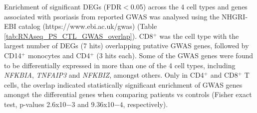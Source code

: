 \begin{figure}[htbp]
\label{figure:RNAseq_PS_CTL_volcano_plots}
\end{figure} 



Enrichment of significant DEGs (FDR$<$0.05) across the 4 cell types and genes associated with psoriasis from reported GWAS was analysed using the NHGRI-EBI catalog (https://www.ebi.ac.uk/gwas) (Table \ref{tab:RNAseq_PS_CTL_GWAS_overlap}). CD8$^+$ was the cell type with the largest number of DEGs (7 hits) overlapping putative GWAS genes, followed by CD14$^+$ monocytes and CD4$^+$ (3 hits each). Some of the GWAS genes were found to be differentially expressed in more than one of the 4 cell types, including \textit{NFKBIA}, \textit{TNFAIP3} and \textit{NFKBIZ}, amongst others. Only in CD4$^+$ and CD8$^+$ T cells, the overlap indicated statistically significant enrichment of GWAS genes amongst the differential genes when comparing patients vs controls (Fisher exact test, p-values 2.6x10${-3}$ and 9.36x10${-4}$, respectively).

